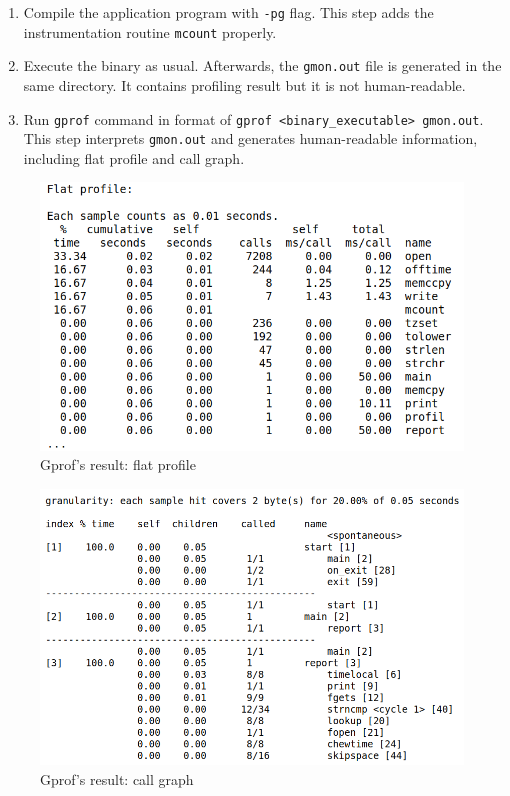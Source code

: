 \begin{enumerate}
    \item Compile the application program with \texttt{-pg} flag. This step adds the instrumentation routine \texttt{mcount} properly.
    \item Execute the binary as usual. Afterwards, the \texttt{gmon.out} file is generated in the same directory. It contains profiling result but it is not human-readable.
    \item Run \texttt{gprof} command in format of \texttt{gprof <binary\_executable> gmon.out}. This step interprets \texttt{gmon.out} and generates human-readable information, including flat profile and call graph.
\end{enumerate}

\begin{figure}[ht]
    \centering
    \includegraphics[width=0.8\linewidth]{figures/gprof_flat_profile.png}
    \caption{Gprof's result: flat profile\cite{gprof}}
    \label{fig:gprof_flat_profile}
\end{figure}

\begin{figure}[ht]
    \centering
    \includegraphics[width=0.8\linewidth]{figures/gprof_call_graph.png}
    \caption{Gprof's result: call graph\cite{gprof}}
    \label{fig:gprof_call_graph}
\end{figure}

